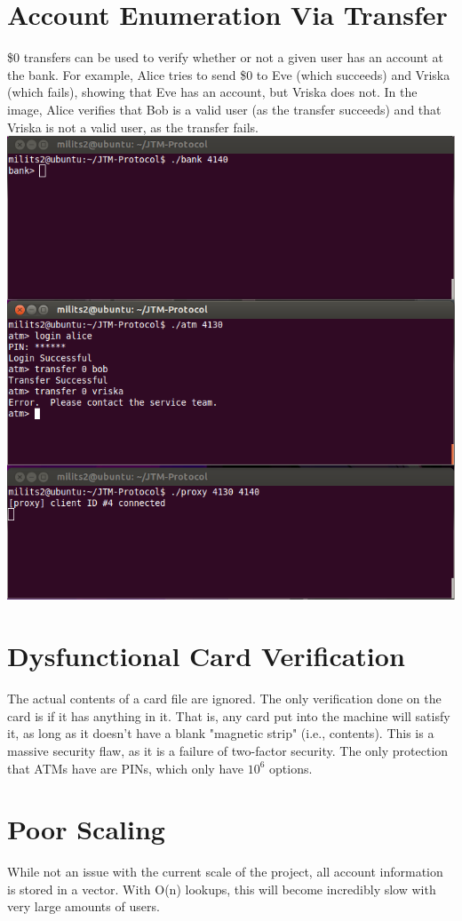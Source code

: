 \documentclass{article}
\begin{document}
\section{Account Enumeration Via Transfer}
\$0 transfers can be used to verify whether or not a given user has an account at the bank. For example, Alice tries to send \$0 to Eve (which succeeds) and Vriska (which fails), showing that Eve has an account, but Vriska does not. In the image, Alice verifies that Bob is a valid user (as the transfer succeeds) and that Vriska is not a valid user, as the transfer fails.
\includegraphics{transferUser.png}

\section{Dysfunctional Card Verification}
The actual contents of a card file are ignored. The only verification done on the card is if it has anything in it. That is, any card put into the machine will satisfy it, as long as it doesn't have a blank "magnetic strip" (i.e., contents). This is a massive security flaw, as it is a failure of two-factor security. The only protection that ATMs have are PINs, which only have $10^6$ options.

\section{Poor Scaling}
While not an issue with the current scale of the project, all account information is stored in a vector. With O(n) lookups, this will become incredibly slow with very large amounts of users.
\end{document}
